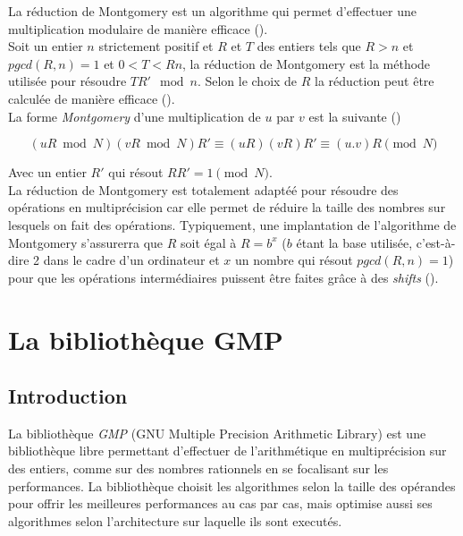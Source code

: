 \documentclass[letterpaper]{article}
\begin{document}
La réduction de Montgomery est un algorithme qui permet d'effectuer une
multiplication modulaire de manière efficace (\cite{menezes1996crypto}).\\

Soit un entier $n$ strictement positif et $R$ et $T$ des entiers tels que $R >
n$ et $pgcd(R, n) = 1$ et $0 < T < Rn$, la réduction de Montgomery est la
méthode utilisée pour résoudre $T R' \mod n$. Selon le choix de $R$ la
réduction peut être calculée de manière efficace (\cite{menezes1996crypto}).\\

La forme \emph{Montgomery} d'une multiplication de $u$ par $v$ est la
suivante (\cite{wikimontgomery})

$$(uR \bmod N)(vR \bmod N) R' ≡ (uR)(vR) R' ≡ (u.v) R \pmod N$$

Avec un entier $R'$ qui résout $RR' = 1 \pmod N$.\\

La réduction de Montgomery est totalement adaptéé pour résoudre des opérations
en multiprécision car elle permet de réduire la taille des nombres sur lesquels
on fait des opérations. Typiquement, une implantation de l'algorithme de
Montgomery s'assurerra que $R$ soit égal à $R = b^{x}$ ($b$ étant la base
utilisée, c'est-à-dire 2 dans le cadre d'un ordinateur et $x$ un nombre qui
résout $pgcd(R, n) = 1$) pour que les opérations intermédiaires puissent être
faites grâce à des \emph{shifts} (\cite{djguan2003montgomery}).



\section{La bibliothèque GMP}

\subsection{Introduction}

La bibliothèque \emph{GMP} (GNU Multiple Precision Arithmetic Library) est une
bibliothèque libre permettant d'effectuer de l'arithmétique en multiprécision sur
des entiers, comme sur des nombres rationnels en se focalisant sur les
performances. La bibliothèque choisit les algorithmes selon la taille des
opérandes pour offrir les meilleures performances au cas par cas, mais optimise
aussi ses algorithmes selon l'architecture sur laquelle ils sont executés.\\
\end{document}
